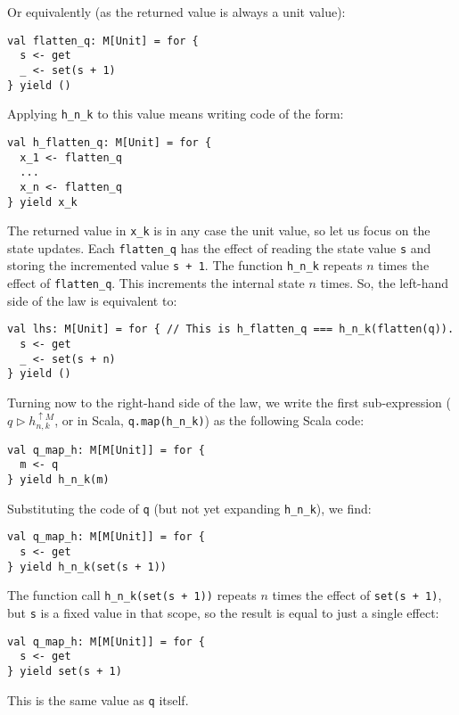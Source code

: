 Or equivalently (as the returned value is always a unit value):
\begin{lstlisting}
val flatten_q: M[Unit] = for {
  s <- get
  _ <- set(s + 1)
} yield ()
\end{lstlisting}
Applying \lstinline!h_n_k! to this value means writing code of the
form:
\begin{lstlisting}
val h_flatten_q: M[Unit] = for {
  x_1 <- flatten_q
  ...
  x_n <- flatten_q
} yield x_k
\end{lstlisting}
The returned value in \lstinline!x_k! is in any case the unit value,
so let us focus on the state updates. Each \lstinline!flatten_q!
has the effect of reading the state value \lstinline!s! and storing
the incremented value \lstinline!s + 1!. The function \lstinline!h_n_k!
repeats $n$ times the effect of \lstinline!flatten_q!. This increments
the internal state $n$ times. So, the left-hand side of the law is
equivalent to:
\begin{lstlisting}
val lhs: M[Unit] = for { // This is h_flatten_q === h_n_k(flatten(q)).
  s <- get
  _ <- set(s + n)
} yield ()
\end{lstlisting}

Turning now to the right-hand side of the law, we write the first
sub-expression ($q\triangleright h_{n,k}^{\uparrow M}$, or in Scala,
\lstinline!q.map(h_n_k)!) as the following Scala code:
\begin{lstlisting}
val q_map_h: M[M[Unit]] = for {
  m <- q
} yield h_n_k(m)
\end{lstlisting}
Substituting the code of \lstinline!q! (but not yet expanding \lstinline!h_n_k!),
we find:
\begin{lstlisting}
val q_map_h: M[M[Unit]] = for {
  s <- get
} yield h_n_k(set(s + 1))
\end{lstlisting}
The function call \lstinline!h_n_k(set(s + 1))! repeats $n$ times
the effect of \lstinline!set(s + 1)!, but \lstinline!s! is a fixed
value in that scope, so the result is equal to just a single effect:
\begin{lstlisting}
val q_map_h: M[M[Unit]] = for {
  s <- get
} yield set(s + 1)
\end{lstlisting}
This is the same value as \lstinline!q! itself.

